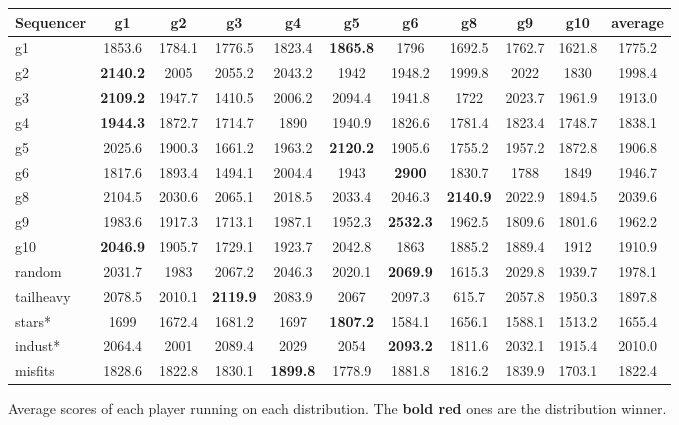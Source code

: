 \documentclass{beamer}
\begin{document}
\begin{frame}
\begin{figure}[ht]
\begin{center}
\begin{tabular}{| l | @{}c | @{}c | @{}c | @{}c | @{}c | @{}c | @{}c | @{}c | @{}c | @{}c |}
\hline
Sequencer & g1 & g2 & g3 & g4 & g5 & g6 & g8 & g9 & g10 & average \\
\hline
g1 & 1853.6 & 1784.1 & 1776.5 & 1823.4 & {\bf \color{red} 1865.8} & 1796 & 1692.5 & 1762.7 & 1621.8 & 1775.2 \\
\hline
g2 & {\bf \color{red} 2140.2} & 2005 & 2055.2 & 2043.2 & 1942 & 1948.2 & 1999.8 & 2022 & 1830 & 1998.4 \\
\hline
g3 & {\bf \color{red} 2109.2} & 1947.7 & 1410.5 & 2006.2 & 2094.4 & 1941.8 & 1722 & 2023.7 & 1961.9 & 1913.0 \\
\hline
g4 & {\bf \color{red} 1944.3} & 1872.7 & 1714.7 & 1890 & 1940.9 & 1826.6 & 1781.4 & 1823.4 & 1748.7 & 1838.1 \\
\hline
g5 & 2025.6 & 1900.3 & 1661.2 & 1963.2 & {\bf \color{red} 2120.2} & 1905.6 & 1755.2 & 1957.2 & 1872.8 & 1906.8 \\
\hline
g6 & 1817.6 & 1893.4 & 1494.1 & 2004.4 & 1943 & {\bf \color{red} 2900} & 1830.7 & 1788 & 1849 & 1946.7 \\
\hline
g8 & 2104.5 & 2030.6 & 2065.1 & 2018.5 & 2033.4 & 2046.3 & {\bf \color{red} 2140.9} & 2022.9 & 1894.5 & 2039.6 \\
\hline
g9 & 1983.6 & 1917.3 & 1713.1 & 1987.1 & 1952.3 & {\bf \color{red} 2532.3} & 1962.5 & 1809.6 & 1801.6 & 1962.2 \\
\hline
g10& {\bf \color{red} 2046.9} & 1905.7 & 1729.1 & 1923.7 & 2042.8 & 1863 & 1885.2 & 1889.4 & 1912 & 1910.9 \\
\hline
random &2031.7 & 1983 & 2067.2 & 2046.3 & 2020.1 & {\bf \color{red} 2069.9} & 1615.3 & 2029.8 & 1939.7 & 1978.1 \\
\hline
tailheavy &2078.5 & 2010.1 & {\bf \color{red} 2119.9} & 2083.9 & 2067 & 2097.3 & 615.7 & 2057.8 & 1950.3 & 1897.8 \\
\hline
stars* &1699 & 1672.4 & 1681.2 & 1697 & {\bf \color{red} 1807.2} & 1584.1 & 1656.1 & 1588.1 & 1513.2 & 1655.4 \\
\hline
indust* &2064.4 & 2001 & 2089.4 & 2029 & 2054 & {\bf \color{red} 2093.2} & 1811.6 & 2032.1 & 1915.4 & 2010.0 \\
\hline
misfits &1828.6 & 1822.8 & 1830.1 & {\bf \color{red} 1899.8} & 1778.9 & 1881.8 & 1816.2 & 1839.9 & 1703.1 & 1822.4 \\
\hline
\end{tabular}
\end{center}
\caption{Average scores of each player running on each distribution. \newline
The {\bf \color{red} bold red} ones are the distribution winner.}\label{fig:table}
\end{figure}
\end{frame}
\end{document}
